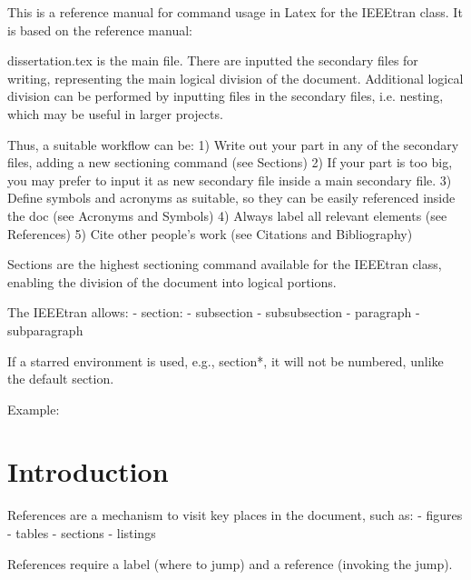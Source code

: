 This is a reference manual for command usage in Latex for the IEEEtran class.
It is based on the reference manual: %

dissertation.tex is the main file. 
There are inputted the secondary files for writing, representing the main logical
division of the document.
Additional logical division can be performed by inputting files in the secondary files,
i.e. nesting, which may be useful in larger projects.

Thus, a suitable workflow can be:
1) Write out your part in any of the secondary files, adding a new sectioning command (see Sections)
2) If your part is too big, you may prefer to input it as new secondary file inside a main secondary file.
3) Define symbols and acronyms as suitable, so they can be easily referenced inside the doc (see Acronyms and Symbols)
4) Always label all relevant elements (see References)
5) Cite other people's work (see Citations and Bibliography)

Sections are the highest sectioning command available for the IEEEtran class,
enabling the division of the document into logical portions.

The IEEEtran allows:
- section: %
- subsection
- subsubsection
- paragraph
- subparagraph

If a starred environment is used, e.g., section*, it will not be numbered,
unlike the default section.

Example:
\section{Introduction}%
\label{sec:introduction}%

References are a mechanism to visit key places in the document, such as:
- figures
- tables
- sections
- listings

References require a label (where to jump) and a reference (invoking the jump).

